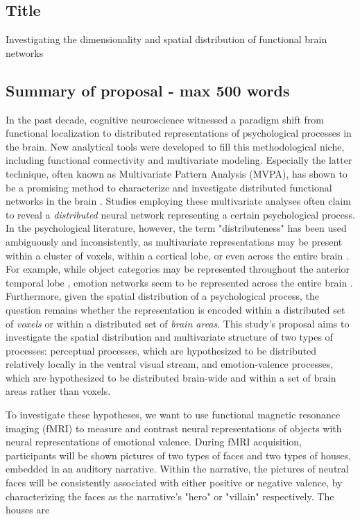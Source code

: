 \documentclass[12pt,a4paper]{article}
\begin{document}
\subsection{Title}
Investigating the dimensionality and spatial distribution of functional brain networks 

\subsection{Summary of proposal \textmd{- max 500 words}}
In the past decade, cognitive neuroscience witnessed a paradigm shift from functional localization to distributed representations of psychological processes in the brain. New analytical tools were developed to fill this methodological niche, including functional connectivity and multivariate modeling. Especially the latter technique, often known as Multivariate Pattern Analysis (MVPA), has shown to be a promising method to characterize and investigate distributed functional networks in the brain . Studies employing these multivariate analyses often claim to reveal a \emph{distributed} neural network representing a certain psychological process. In the psychological literature, however, the term "distributeness" has been used ambiguously and inconsistently, as multivariate representations may be present within a cluster of voxels, within a cortical lobe, or even across the entire brain \citep{coutanche2013}. For example, while object categories may be represented throughout the anterior temporal lobe \citep{haxby2001}, emotion networks seem to be represented across the entire brain \citep{lindquist2012}. Furthermore, given the spatial distribution of a psychological process, the question remains whether the representation is encoded within a distributed set of \emph{voxels} or within a distributed set of \emph{brain areas}. This study's proposal aims to investigate the spatial distribution and multivariate structure of two types of processes: perceptual processes, which are hypothesized to be distributed relatively locally in the ventral visual stream, and emotion-valence processes, which are hypothesized to be distributed brain-wide and within a set of brain areas rather than voxels. 

To investigate these hypotheses, we want to use functional magnetic resonance imaging (fMRI) to measure and contrast neural representations of objects with neural representations of emotional valence. During fMRI acquisition, participants will be shown pictures of two types of faces and two types of houses, embedded in an auditory narrative. Within the narrative, the pictures of neutral faces will be consistently associated with either positive or negative valence, by characterizing the faces as the narrative's "hero" or "villain" respectively. The houses are     
\end{document}
